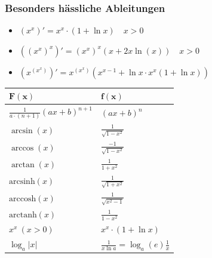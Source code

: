 \documentclass[7pt,landscape, margin = 0.1mm]{article}
\begin{document}
\begin{multicols}{4}
\subsubsection{Besonders hässliche Ableitungen}
\begin{itemize}
 \item $\left(x^x\right)' = x^x \cdot(1+\ln x) \quad x>0$ 
\item $\left(\left(x^x\right)^x \right)'= \left(x^x\right)^x(x+2 x \ln (x)) \quad x>0$ 
\item $\left(x^{\left(x^x\right)} \right)'=x^{\left(x^x\right)}\left(x^{x-1}+\ln x \cdot x^x(1+\ln x)\right)$
\end{itemize}
\begin{center}
  \begin{tabularx}{\linewidth}{>{\centering\arraybackslash}X>{\centering\arraybackslash}X}
  \toprule
  $\mathbf{F(x)}$ & $\mathbf{f(x)}$ \\
  \midrule
  $\frac{1}{a\cdot (n+1)}(ax+b)^{n+1}$ & $(ax+b)^n$ \\
  
  $\arcsin(x)$ & $\frac{1}{\sqrt{1 - x^2}}$ \\
  $\arccos(x)$ & $\frac{-1}{\sqrt{1 - x^2}}$ \\
  $\arctan(x)$ & $\frac{1}{1 + x^2}$ \\ 
  $\text{arcsinh}(x)$ & $\frac{1}{\sqrt{1 + x^2}}$ \\
  $\text{arccosh}(x) $ & $\frac{1}{\sqrt{x^2 - 1}}$ \\
  $\text{arctanh}(x) $ & $\frac{1}{1 - x^2}$ \\ 
  $x^x \ (x > 0)$ & $x^x \cdot (1 + \ln x)$ \\
  $\log_a|x|$ & $\frac{1}{x \ln a}=\log_a(e)\frac{1}{x}$ \\
  \bottomrule
  \end{tabularx}
\end{center}









\end{multicols}
\end{document}
